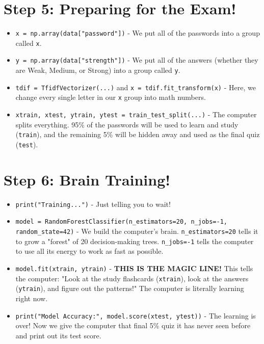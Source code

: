 \documentclass{article}
\begin{document}
\section*{Step 5: Preparing for the Exam!}
\begin{itemize}
    \item \texttt{x = np.array(data["password"])} - We put all of the passwords into a group called \texttt{x}.
    \item \texttt{y = np.array(data["strength"])} - We put all of the answers (whether they are Weak, Medium, or Strong) into a group called \texttt{y}.
    \item \texttt{tdif = TfidfVectorizer(...)} and \texttt{x = tdif.fit\_transform(x)} - Here, we change every single letter in our \texttt{x} group into math numbers.
    \item \texttt{xtrain, xtest, ytrain, ytest = train\_test\_split(...)} - The computer splits everything. 95\% of the passwords will be used to learn and study (\texttt{train}), and the remaining 5\% will be hidden away and used as the final quiz (\texttt{test}).
\end{itemize}

\section*{Step 6: Brain Training!}
\begin{itemize}
    \item \texttt{print("Training...")} - Just telling you to wait!
    \item \texttt{model = RandomForestClassifier(n\_estimators=20, n\_jobs=-1, random\_state=42)} - We build the computer's brain. \texttt{n\_estimators=20} tells it to grow a "forest" of 20 decision-making trees. \texttt{n\_jobs=-1} tells the computer to use all its energy to work as fast as possible.
    \item \texttt{model.fit(xtrain, ytrain)} - \textbf{THIS IS THE MAGIC LINE!} This tells the computer: "Look at the study flashcards (\texttt{xtrain}), look at the answers (\texttt{ytrain}), and figure out the patterns!" The computer is literally learning right now.
    \item \texttt{print("Model Accuracy:", model.score(xtest, ytest))} - The learning is over! Now we give the computer that final 5\% quiz it has never seen before and print out its test score.
\end{itemize}
\end{document}
